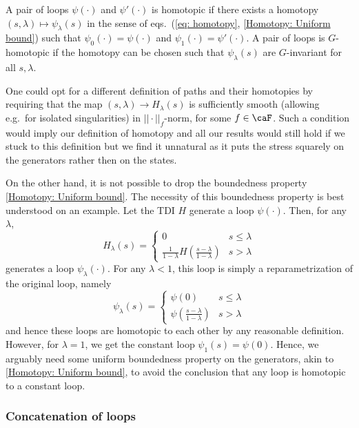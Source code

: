 \begin{definition}
	A pair of loops $\psi(\cdot)$ and $\psi'(\cdot)$ is homotopic if there exists a homotopy $(s,\lambda)\mapsto \psi_\lambda(s)$ in the sense of eqs.\ (\ref{eq: homotopy}, \ref{Homotopy: Uniform bound}) such that $\psi_0(\cdot)=\psi(\cdot)$ and $\psi_1(\cdot)=\psi'(\cdot)$.   
	A pair of loops is $G$-homotopic if the homotopy can be chosen such that $ \psi_\lambda(s)$ are $G$-invariant  for all $s,\lambda$.   
\end{definition}  


One could opt for a different definition of paths and their homotopies by requiring that the map $(s,\lambda)\to H_\lambda(s)$ is sufficiently smooth (allowing e.g.\ for isolated singularities) in $||\cdot||_f$-norm, for some $f\in\caF$. Such a condition would imply our definition of homotopy and all our results would still hold if we stuck to this definition but we find it unnatural as it puts the stress squarely on the generators rather then on the states.


On the other hand, it is not possible to drop the boundedness property \eqref{Homotopy: Uniform bound}. The necessity of this boundedness property is best understood on an example. Let the TDI $H$ generate a loop $\psi(\cdot)$. Then, for any $\lambda$, 
$$
H_\lambda(s)= \begin{cases} 0  &  s\leq \lambda \\
	\tfrac{1}{1-\lambda} H(\tfrac{s-\lambda}{1-\lambda})&  s>\lambda
\end{cases}
$$ 
generates a loop  $\psi_\lambda(\cdot)$. 
For any $\lambda<1$, this loop is simply a reparametrization of the original loop, namely 
$$
\psi_\lambda(s)= \begin{cases} \psi(0)  &  s\leq \lambda \\
	\psi( \tfrac{s-\lambda}{1-\lambda})  &  s>\lambda
\end{cases}
$$ 
and hence these loops are homotopic to each other by any reasonable definition. However, for $\lambda=1$, we get the constant loop $\psi_1(s)=\psi(0)$. Hence, we arguably need some uniform boundedness property on the generators, akin to \eqref{Homotopy: Uniform bound}, to avoid the conclusion that any loop is homotopic to a constant loop. 


\subsubsection{Concatenation of loops} \label{sec: concatenation loops}

